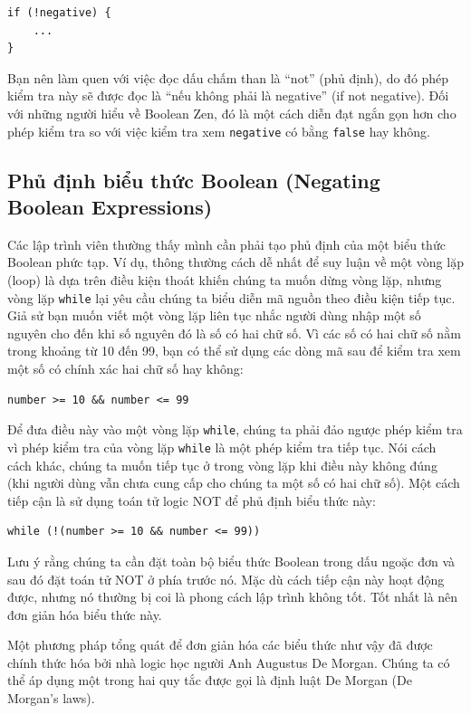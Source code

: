 \begin{verbatim}
if (!negative) {
    ...
}
\end{verbatim}

Bạn nên làm quen với việc đọc dấu chấm than là ``not'' (phủ định), do đó phép kiểm tra này sẽ được đọc là ``nếu không phải là negative'' (if not negative). Đối với những người hiểu về Boolean Zen, đó là một cách diễn đạt ngắn gọn hơn cho phép kiểm tra so với việc kiểm tra xem \texttt{negative} có bằng \texttt{false} hay không.

\subsection*{Phủ định biểu thức Boolean (Negating Boolean Expressions)}

Các lập trình viên thường thấy mình cần phải tạo phủ định của một biểu thức Boolean phức tạp. Ví dụ, thông thường cách dễ nhất để suy luận về một vòng lặp (loop) là dựa trên điều kiện thoát khiến chúng ta muốn dừng vòng lặp, nhưng vòng lặp \texttt{while} lại yêu cầu chúng ta biểu diễn mã nguồn theo điều kiện tiếp tục. Giả sử bạn muốn viết một vòng lặp liên tục nhắc người dùng nhập một số nguyên cho đến khi số nguyên đó là số có hai chữ số. Vì các số có hai chữ số nằm trong khoảng từ 10 đến 99, bạn có thể sử dụng các dòng mã sau để kiểm tra xem một số có chính xác hai chữ số hay không:

\begin{verbatim}
number >= 10 && number <= 99
\end{verbatim}

Để đưa điều này vào một vòng lặp \texttt{while}, chúng ta phải đảo ngược phép kiểm tra vì phép kiểm tra của vòng lặp \texttt{while} là một phép kiểm tra tiếp tục. Nói cách cách khác, chúng ta muốn tiếp tục ở trong vòng lặp khi điều này không đúng (khi người dùng vẫn chưa cung cấp cho chúng ta một số có hai chữ số). Một cách tiếp cận là sử dụng toán tử logic NOT để phủ định biểu thức này:

\begin{verbatim}
while (!(number >= 10 && number <= 99))
\end{verbatim}

Lưu ý rằng chúng ta cần đặt toàn bộ biểu thức Boolean trong dấu ngoặc đơn và sau đó đặt toán tử NOT ở phía trước nó. Mặc dù cách tiếp cận này hoạt động được, nhưng nó thường bị coi là phong cách lập trình không tốt. Tốt nhất là nên đơn giản hóa biểu thức này.

Một phương pháp tổng quát để đơn giản hóa các biểu thức như vậy đã được chính thức hóa bởi nhà logic học người Anh Augustus De Morgan. Chúng ta có thể áp dụng một trong hai quy tắc được gọi là định luật De Morgan (De Morgan's laws).

